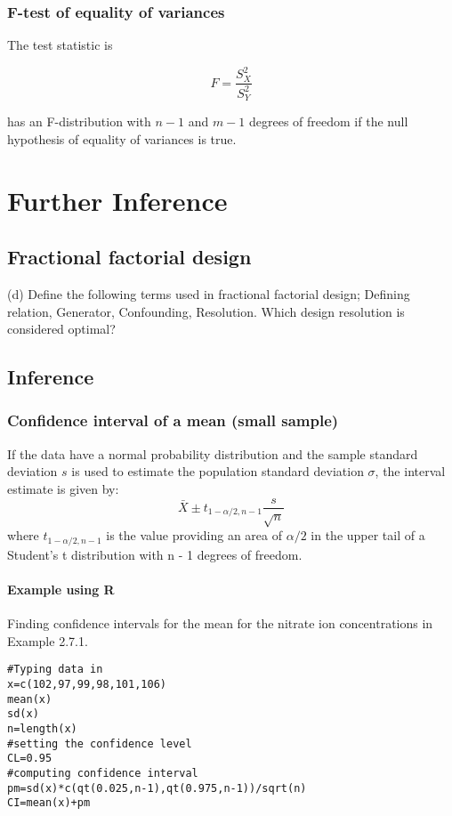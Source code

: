 \documentclass[14pt, a4paper]{article}
\theoremstyle{plain}
\theoremstyle{definition}
\theoremstyle{remark}
\begin{document}
\subsection{F-test of equality of variances}
The test statistic is

\begin{equation} F = \frac{S_X^2}{S_Y^2}\end{equation}

has an F-distribution with $n-1$ and $m-1$ degrees of freedom if the null hypothesis of equality of variances is true.


\chapter{Further Inference}

\section{Fractional factorial design}

(d)	Define the following terms used in fractional factorial design; Defining relation,
	Generator, Confounding, Resolution. Which design resolution is considered
	optimal?




\section{Inference}

\subsection{Confidence interval of a mean (small sample)}

If the data have a normal probability distribution and the sample
standard deviation $s$ is used to estimate the population
standard deviation $\sigma$, the interval estimate is given by:
\begin{equation}
\bar{X} \pm t_{1-\alpha/2,n-1}\frac{s}{\sqrt{n}}
\end{equation}
where $t_{1-\alpha/2,n-1}$ is the value providing an area of $\alpha/2$ in the upper tail of a Student’s t distribution with n - 1 degrees of freedom.

\subsubsection{Example using R}
Finding confidence intervals for the mean for the nitrate ion
concentrations in Example 2.7.1.
\begin{verbatim}
#Typing data in
x=c(102,97,99,98,101,106)
mean(x)
sd(x)
n=length(x)
#setting the confidence level
CL=0.95
#computing confidence interval
pm=sd(x)*c(qt(0.025,n-1),qt(0.975,n-1))/sqrt(n)
CI=mean(x)+pm
\end{verbatim}

%
\end{document}
